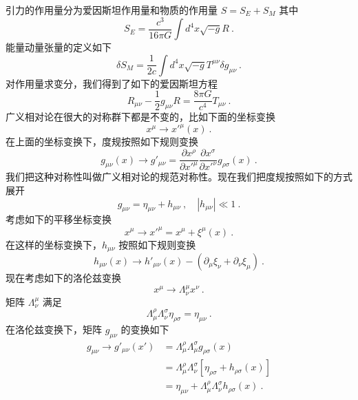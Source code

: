 
\begin{issues}
\issueNeedCite
\issueMissDepend
\end{issues}

引力的作用量分为爱因斯坦作用量和物质的作用量 $S=S_E+S_M$ 其中
\begin{equation}
S_E = \frac{c^3}{16\pi G} \int d^4 x \sqrt{-g} R~.
\end{equation}
能量动量张量的定义如下
\begin{equation}
\delta S_M = \frac{1}{2 c} \int d^4 x \sqrt{-g} T^{\mu\nu} \delta g_{\mu\nu} ~. 
\end{equation}
对作用量求变分，我们得到了如下的爱因斯坦方程
\begin{equation}
R_{\mu\nu} - \frac{1}{2} g_{\mu\nu} R = \frac{8\pi G}{c^4} T_{\mu\nu} ~. 
\end{equation}
广义相对论在很大的对称群下都是不变的，比如下面的坐标变换
\begin{equation}
x^\mu \rightarrow x'^\mu (x) ~. 
\end{equation}
在上面的坐标变换下，度规按照如下规则变换
\begin{equation}
g_{\mu\nu} (x) \rightarrow g'_{\mu\nu}  = \frac{\partial x^\rho}{\partial x'^\mu} \frac{\partial x^\sigma}{\partial x'^\nu} g_{\rho\sigma} (x) ~. 
\end{equation}
我们把这种对称性叫做广义相对论的规范对称性。现在我们把度规按照如下的方式展开
\begin{equation}\label{Geomet_eq1}
g_{\mu\nu} = \eta_{\mu\nu} + h_{\mu\nu}~, \quad |h_{\mu\nu}| \ll 1 ~. 
\end{equation} 
考虑如下的平移坐标变换
\begin{equation}
x^\mu \rightarrow x'^\mu = x^\mu + \xi^\mu (x) ~. 
\end{equation}
在这样的坐标变换下，$h_{\mu\nu}$ 按照如下规则变换
\begin{equation}
h_{\mu\nu} (x) \rightarrow h'_{\mu\nu} (x) - (\partial_\mu\xi_\nu+\partial_\nu \xi_\mu) ~.
\end{equation}
现在考虑如下的洛伦兹变换
\begin{equation}
x^\mu \rightarrow \Lambda^\mu_\nu x^\nu ~.
\end{equation}
矩阵 $\Lambda^\mu_\nu$ 满足
\begin{equation}
\Lambda^\rho_\mu\Lambda^\sigma_\nu \eta_{\rho\sigma} = \eta_{\mu\nu} ~. 
\end{equation}
在洛伦兹变换下，矩阵 $g_{\mu\nu}$ 的变换如下
\begin{equation} 
\begin{aligned}
g_{\mu\nu} \rightarrow g'_{\mu\nu} (x') & = \Lambda^\rho_\mu \Lambda^\sigma_\mu g_{\rho\sigma} (x) \\ 
& = \Lambda^\rho_\mu \Lambda^\sigma_\nu [\eta_{\rho\sigma} + h_{\rho\sigma}(x)] \\
& = \eta_{\mu\nu} + \Lambda^\rho_\mu \Lambda^\sigma_\nu h_{\rho\sigma} (x) ~.
\end{aligned}
\end{equation}
